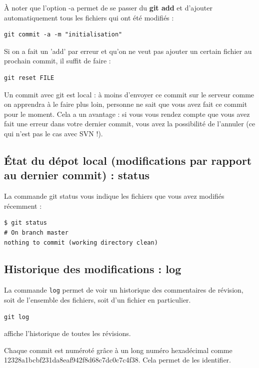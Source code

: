 \documentclass[a4paper,twoside]{article}
\begin{document}
À noter que l'option -a permet de se passer du \textbf{git add} et d'ajouter automatiquement tous les fichiers qui ont été modifiés :
 \begin{verbatim}
git commit -a -m "initialisation"
\end{verbatim}

\begin{remarque}
Si on a fait un 'add' par erreur et qu'on ne veut pas ajouter un certain fichier au prochain commit, il suffit de faire :
\begin{verbatim}
git reset FILE
\end{verbatim}
\end{remarque}

\bigskip

\begin{attention}
Un commit avec git est local : à moins d'envoyer ce commit sur le serveur comme on apprendra à le faire plus loin, personne ne sait que vous avez fait ce commit pour le moment. Cela a un avantage : si vous vous rendez compte que vous avez fait une erreur dans votre dernier commit, vous avez la possibilité de l'annuler (ce qui n'est pas le cas avec SVN !).
\end{attention}

\subsection{État du dépot local (modifications par rapport au dernier commit) : status}
La commande git status vous indique les fichiers que vous avez modifiés récemment :
\begin{verbatim}
$ git status
# On branch master
nothing to commit (working directory clean)
\end{verbatim}

\subsection{Historique des modifications : log}
La commande \texttt{log} permet de voir un historique des commentaires de révision, soit de l'ensemble des fichiers, soit d'un fichier en particulier.

\begin{verbatim}
git log
\end{verbatim}
affiche l'historique de toutes les révisions.

\begin{attention}
Chaque commit est numéroté grâce à un long numéro hexadécimal comme 12328a1bcbf231da\-8eaf942f8d68c7dc0c7c4f38. Cela permet de les identifier.
\end{attention}
\end{document}
